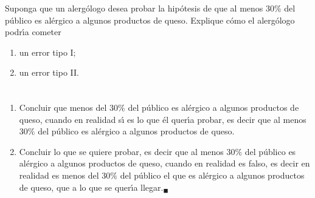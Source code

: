 \begin{enunciado}
 Suponga que un alerg\'ologo desea probar la hip\'otesis de que al menos $30\%$ del p\'ublico es al\'ergico a algunos productos de queso. Explique c\'omo el alerg\'ologo podr\'{\i}a cometer
 \begin{enumerate}
  \item un error tipo I;
  \item un error tipo II.
 \end{enumerate}
\end{enunciado}

\begin{solucion}
 $\phantom{0}$
 \begin{enumerate}
  \item Concluir que menos del $30\%$ del p\'ublico es al\'ergico a algunos productos de queso, cuando en realidad s\'{\i} es lo que \'el quer\'{\i}a probar, es decir que al menos $30\%$ del p\'ublico es al\'ergico a algunos productos de queso.
  
  \item Concluir lo que se quiere probar, es decir que al menos $30\%$ del p\'ublico es al\'ergico a algunos productos de queso, cuando en realidad es falso, es decir en realidad es menos del $30\%$ del p\'ublico el que es al\'ergico a algunos productos de queso, que a lo que se quer\'{\i}a llegar.${}_{\blacksquare}$
 \end{enumerate}
\end{solucion}
